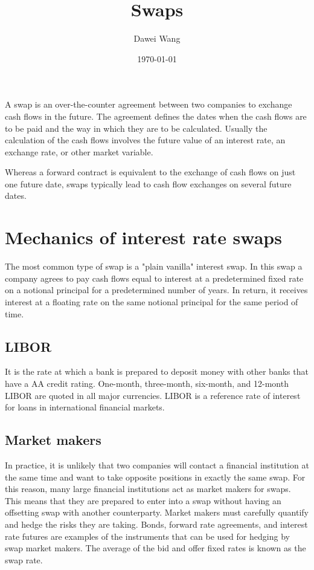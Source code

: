 \documentclass{article}
\title{Swaps}
\author{Dawei Wang}
\date{\today}
\begin{document}
	\maketitle
A swap is an over-the-counter agreement between two companies to exchange cash flows in the future. The agreement defines the dates when the cash flows are to be paid and the way in which they are to be calculated. Usually the calculation of the cash flows involves the future value of an interest rate, an exchange rate, or other market variable.

Whereas a forward contract is equivalent to the exchange of cash flows on just one future date, swaps typically lead to cash flow exchanges on several future dates.

\section{Mechanics of interest rate swaps}	
The most common type of swap is a "plain vanilla" interest swap. In this swap a company agrees to pay cash flows equal to interest at a predetermined fixed rate on a notional principal for a predetermined number of years. In return, it receives interest at a floating rate on the same notional principal for the same period of time.

\subsection{LIBOR}
It is the rate at which a bank is prepared to deposit money with other banks that have a AA credit rating. One-month, three-month, six-month, and 12-month LIBOR are quoted in all major currencies. LIBOR is a reference rate of interest for loans in international financial markets.

\subsection{Market makers}
In practice, it is unlikely that two companies will contact a financial institution at the same time and want to take opposite positions in exactly the same swap. For this reason, many large financial institutions act as market makers for swaps. This means that they are prepared to enter into a swap without having an offsetting swap with another counterparty. Market makers must carefully quantify and hedge the risks they are taking. Bonds, forward rate agreements, and interest rate futures are examples of the instruments that can be used for hedging by swap market makers. The average of the bid and offer fixed rates is known as the swap rate.
\end{document}
